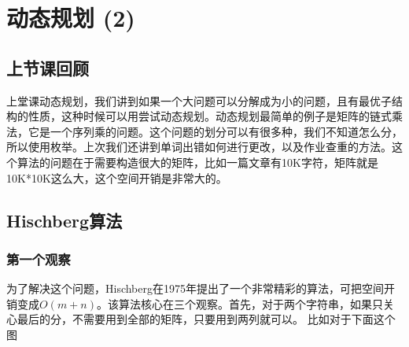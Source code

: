 

\chapter{动态规划 (2)}


\section{上节课回顾}
上堂课动态规划，我们讲到如果一个大问题可以分解成为小的问题，且有最优子结构的性质，这种时候可以用尝试动态规划。动态规划最简单的例子是矩阵的链式乘法，它是一个序列乘的问题。这个问题的划分可以有很多种，我们不知道怎么分，所以使用枚举。上次我们还讲到单词出错如何进行更改，以及作业查重的方法。这个算法的问题在于需要构造很大的矩阵，比如一篇文章有10K字符，矩阵就是10K*10K这么大，这个空间开销是非常大的。


\section{Hischberg算法}
\subsection{第一个观察}
为了解决这个问题，Hischberg在1975年提出了一个非常精彩的算法，可把空间开销变成$O(m+n)$。该算法核心在三个观察。首先，对于两个字符串，如果只关心最后的分，不需要用到全部的矩阵，只要用到两列就可以。
比如对于下面这个图

